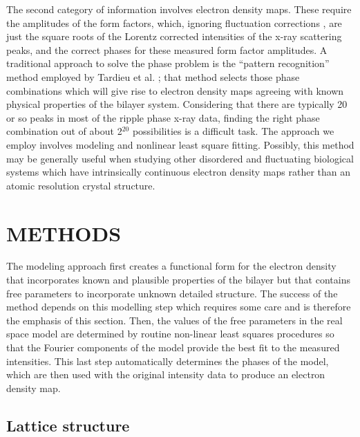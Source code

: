 The second category of information involves electron density maps.  These
require the amplitudes of the form factors, which, ignoring
fluctuation corrections \cite{Nagle96}, are just the square roots of
the Lorentz corrected intensities of the x-ray scattering peaks,
and the correct phases for these measured form factor amplitudes.
A traditional approach to solve the phase problem is the 
``pattern recognition'' method employed by Tardieu et al. 
\cite{Tar73}; that method
selects those phase combinations which will give rise to electron density maps 
agreeing with known physical properties of the bilayer system.
Considering that there are typically 20 or so 
peaks in most of the ripple phase x-ray data, finding the right phase 
combination out of about 2$^{20}$ possibilities is a difficult task.
The approach we employ involves modeling and nonlinear least square fitting.
Possibly, this method may be generally useful when studying other disordered
and fluctuating biological systems which have intrinsically continuous 
electron density maps rather than an atomic resolution crystal structure.

\section{METHODS}

The modeling approach first creates a functional form for the electron density 
that incorporates known and plausible properties of the bilayer but that
contains free parameters to incorporate unknown detailed structure.
The success of the method depends on this modelling step which requires some care
and is therefore the emphasis of this section.
Then, the values of the free parameters in the real space model are 
determined by routine non-linear least squares procedures so that the Fourier
components of the model provide the best fit to the measured intensities.
This last step automatically determines the phases of the model, which are
then used with the original intensity data to produce an electron density map.

\subsection{Lattice structure}

